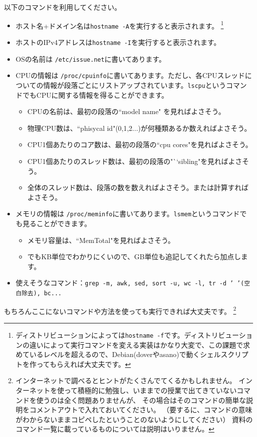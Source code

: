 \documentclass[a4j]{ltjreport}
\begin{document}
    以下のコマンドを利用してください。
    \begin{itemize}
        \item ホスト名+ドメイン名は\texttt{hostname -A}を実行すると表示されます。
        \footnote{ディストリビューションによっては\texttt{hostname -f}です。ディストリビューションの違いによって実行コマンドを変える実装はかなり大変で、この課題で求めているレベルを超えるので、Debian(doverやasano)で動くシェルスクリプトを作ってもらえれば大丈夫です。}
        \item ホストのIPv4アドレスは\texttt{hostname -I}を実行すると表示されます。
        \item OSの名前は \verb|/etc/issue.net|に書いてあります。
       \item CPUの情報は \verb|/proc/cpuinfo|に書いてあります。ただし、各CPUスレッドについての情報が段落ごとにリストアップされています。\verb+lscpu+というコマンドでもCPUに関する情報を得ることができます。
      \begin{itemize} 
         \item CPUの名前は、最初の段落の``model name" を見ればよさそう。
            \item 物理CPU数は、``phisycal id"(0,1,2...)が何種類あるか数えればよさそう。
            \item CPU1個あたりのコア数は、最初の段落の``cpu cores"を見ればよさそう。
            \item CPU1個あたりのスレッド数は、最初の段落の"``sibling"を見ればよさそう。
            \item 全体のスレッド数は、段落の数を数えればよさそう。または計算すればよさそう。
        \end{itemize}
    \item メモリの情報は \verb|/proc/meminfo|に書いてあります。\verb+lsmem+というコマンドでも見ることができます。
    \begin{itemize}
            \item メモリ容量は、``MemTotal"を見ればよさそう。
            \item でもKB単位でわかりにくいので、GB単位も追記してくれたら加点します。
        \end{itemize}
        \item 使えそうなコマンド：\texttt{grep -m, awk, sed, sort -u, wc -l, tr -d ' '(空白除去), bc...}
    \end{itemize}
    もちろんここにないコマンドや方法を使っても実行できれば大丈夫です。
    \footnote{インターネットで調べるとヒントがたくさんでてくるかもしれません。
    インターネットを使って積極的に勉強し、いままでの授業で出てきていないコマンドを使うのは全く問題ありませんが、
    その場合はそのコマンドの簡単な説明をコメントアウトで入れておいてください。
    （要するに、コマンドの意味がわからないままコピペしたということのないようにしてください）
    資料のコマンド一覧に載っているものについては説明はいりません。}
\end{document}
